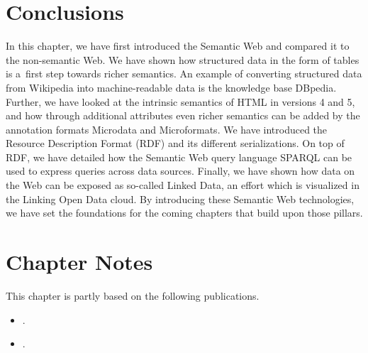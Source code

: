 \section{Conclusions}

In this chapter, we have first introduced the Semantic Web
and compared it to the non-semantic Web.
We have shown how structured data in the form of tables
is a~first step towards richer semantics.
An example of converting structured data from Wikipedia
into machine-readable data is the knowledge base DBpedia.
Further, we have looked at the intrinsic semantics
of HTML in versions 4 and 5,
and how through additional attributes
even richer semantics can be added
by the annotation formats Microdata and Microformats.
We have introduced the Resource Description Format (RDF)
and its different serializations.
On top of RDF, we have detailed
how the Semantic Web query language SPARQL
can be used to express queries across data sources.
Finally, we have shown how data on the Web
can be exposed as so-called Linked Data,
an effort which is visualized in the Linking Open Data cloud.
By introducing these Semantic Web technologies,
we have set the foundations for the coming chapters
that build upon those pillars.

\section*{Chapter Notes}
This chapter is partly based on the following publications.

\begin{itemize}
  \item {}.
  \item {}.
\end{itemize}


\clearpage

